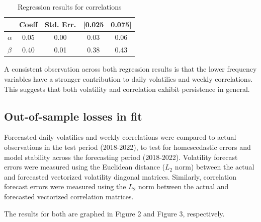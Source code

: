 \documentclass{article}
\begin{document}
\begin{table}[ht]
    \centering
    \caption{Regression results for correlations}
    \begin{tabular}{lcccc}
    \toprule
    \textbf{} & \textbf{Coeff} & \textbf{Std. Err.} & \textbf{[0.025} & \textbf{0.075]} \\
    \midrule  
    $\alpha$ & 0.05 & 0.00 & 0.03 & 0.06 \\
    $\beta$ & 0.40 & 0.01 & 0.38 & 0.43 \\  
    \bottomrule
    \end{tabular}
\end{table}

A consistent observation across both regression results is that the lower frequency
variables have a stronger contribution to daily volatilies and weekly correlations. 
This suggests that both volatility and correlation exhibit persistence in general.

\subsection{Out-of-sample losses in fit}

Forecasted daily volatilies and weekly correlations were compared to actual observations
in the test period (2018-2022), to test for homescedastic errors and model stability across
the forecasting period (2018-2022). Volatility forecast errors were measured using the Euclidean distance ($L_2$ norm)
between the actual and forecasted vectorized volatility diagonal matrices. Similarly, correlation forecast
errors were measured using the $L_2$ norm between the actual and forecasted vectorized correlation matrices.

The results for both are graphed in Figure 2 and Figure 3, respectively.
\end{document}
